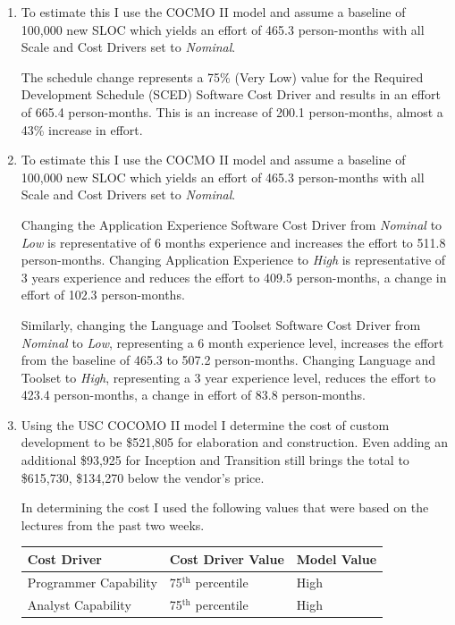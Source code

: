 \documentclass[letterpaper,10pt]{article}
\begin{document}
\begin{enumerate}
\begin{center}
	\end{center}
	\item To estimate this I use the COCMO II model and assume a baseline of 100,000 new SLOC which yields an effort of 465.3 person-months with all Scale and Cost Drivers set to \emph{Nominal}.  
	\par 
	The schedule change represents a 75\% (Very Low) value for the Required Development Schedule (SCED) Software Cost Driver and results in an effort of 665.4 person-months.  This is an increase of 200.1 person-months, almost a 43\% increase in effort.
	\item To estimate this I use the COCMO II model and assume a baseline of 100,000 new SLOC which yields an effort of 465.3 person-months with all Scale and Cost Drivers set to \emph{Nominal}. 
	\par
	Changing the Application Experience Software Cost Driver from \emph{Nominal} to \emph{Low} is representative of 6 months experience and increases the effort to 511.8 person-months.  Changing Application Experience to \emph{High} is representative of 3 years experience and reduces the effort to 409.5 person-months, a change in effort of 102.3 person-months.
	\par
	Similarly, changing the Language and Toolset Software Cost Driver from \emph{Nominal} to \emph{Low}, representing a 6 month experience level, increases the effort from the baseline of 465.3 to 507.2 person-months.  Changing Language and Toolset to \emph{High}, representing a 3 year experience level, reduces the effort to 423.4 person-months, a change in effort of 83.8 person-months.
	\item Using the USC COCOMO II model I determine the cost of custom development to be \$521,805 for elaboration and construction.  Even adding an additional \$93,925 for Inception and Transition still brings the total to \$615,730, \$134,270 below the vendor's price.
	\par
	In determining the cost I used the following values that were based on the lectures from the past two weeks.
	\begin{table}[htdp]
\begin{center}
\begin{tabular}{lll}
\hline
\textbf{Cost Driver} & \textbf{Cost Driver Value} & \textbf{Model Value} \\
\hline
Programmer Capability & 75$^{\mbox{th}}$ percentile & High \\
Analyst Capability & 75$^{\mbox{th}}$ percentile & High \\

\end{tabular}
\end{center}
\end{table}
\end{enumerate}
\end{document}
